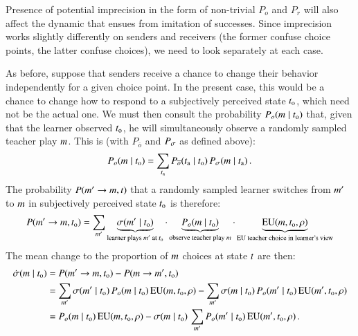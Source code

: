 \documentclass[fleqn,reqno,10pt]{article}
\begin{document}
Presence of potential imprecision in the form of non-trivial $P_o$ and $P_r$ will also affect
the dynamic that ensues from imitation of successes. Since imprecision works slightly
differently on senders and receivers (the former confuse choice points, the latter confuse
choices), we need to look separately at each case.

As before, suppose that senders receive a chance to change their behavior independently for a
given choice point. In the present case, this would be a chance to change how to respond to a
subjectively perceived state $t_{\mathrm{o}}$, which need not be the actual one. We must then
consult the probability $P_o(m \mid t_{\mathrm{o}})$ that, given that the learner
observed $t_{\mathrm{o}}$, he will simultaneously observe a randomly sampled teacher play
$m$. This is (with $P_{\overline{o}}$ and $P_{\sigma}$ as defined above):
\begin{align*}
  P_o(m \mid t_{\mathrm{o}}) = \sum_{t_{\mathrm{a}}} P_{\overline{o}}(t_{\mathrm{a}}
  \mid t_{\mathrm{o}}) \thinspace P_{\sigma}(m \mid t_{\mathrm{a}})\,.
\end{align*}
The probability $P(m' \rightarrow m, t)$ that a randomly sampled learner switches
from $m'$ to $m$ in subjectively perceived state $t_{\mathrm{o}}$ is therefore:
\begin{align*}
  P(m' \rightarrow m, t_{\mathrm{o}}) = \sum_{m'} \underbrace{\sigma(m' \mid
    t_{\mathrm{o}})}_{\text{learner plays $m'$ at $t_{\mathrm{o}}$}} \cdot
  \underbrace{P_{o}(m \mid t_{\mathrm{o}})}_{\text{observe teacher play $m$}} \cdot
  \underbrace{\mathrm{EU}(m, t_{\mathrm{o}}, \rho)}_{\text{EU teacher choice in learner's view}}
\end{align*}
The mean change to the proportion of $m$ choices at state $t$ are then:
\begin{align}
  \label{eq:nRDSender}
  \dot{\sigma}(m \mid t_{\mathrm{o}}) & = P(m' \rightarrow m, t_{\mathrm{o}}) - P(m
  \rightarrow m', t_{\mathrm{o}}) \nonumber \\
  & = \sum_{m'} \sigma(m' \mid t_{\mathrm{o}}) \thinspace P_o(m \mid
  t_{\mathrm{o}}) \thinspace \mathrm{EU}(m, t_{\mathrm{o}}, \rho) - \sum_{m'} \sigma(m \mid t_{\mathrm{o}}) \thinspace
  P_o(m' \mid t_{\mathrm{o}}) \thinspace \mathrm{EU}(m', t_{\mathrm{o}}, \rho) \nonumber \\
  & = P_o(m \mid t_{\mathrm{o}}) \thinspace \mathrm{EU}(m, t_{\mathrm{o}}, \rho) - \sigma(m \mid t_{\mathrm{o}}) \thinspace \sum_{m'} P_o(m' \mid t_{\mathrm{o}}) \thinspace \mathrm{EU}(m', t_{\mathrm{o}}, \rho)\,.
\end{align}
\end{document}
